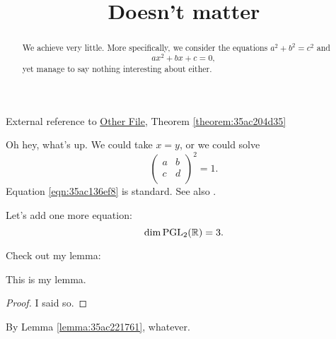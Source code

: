 \documentclass[reqno]{amsart} 
\title{Doesn't matter}
\numberwithin{equation}{section}
\begin{document}
\maketitle

\begin{abstract}
  We achieve very little.  More specifically, we consider the equations
  \(a^2 + b^2 = c^2\) and
  \begin{equation*}
a x^2 + b x + c = 0,
\end{equation*}
yet manage to say nothing interesting about either.
\end{abstract}

External reference to \href{test2.pdf}{Other File}, Theorem \ref{theorem:35ac204d35}

Oh hey, what's up.  We could take $x = y$, or we could solve
\begin{equation}\label{eqn:35ac136ef8}
  \begin{pmatrix}
    a & b \\
    c & d \\
  \end{pmatrix}^2 = 1.
\end{equation}
Equation \eqref{eqn:35ac136ef8} is standard.  See also \cite{2021arXiv210915230N}.

Let's add one more equation:
\begin{equation*}
\dim \operatorname{PGL}_2(\mathbb{R}) = 3.
\end{equation*}

Check out my lemma:
\begin{lemma}\label{lemma:35ac221761}
This is my lemma.
\end{lemma}
\begin{proof}
I said so.
\end{proof}
By Lemma \ref{lemma:35ac221761}, whatever.
\end{document}
